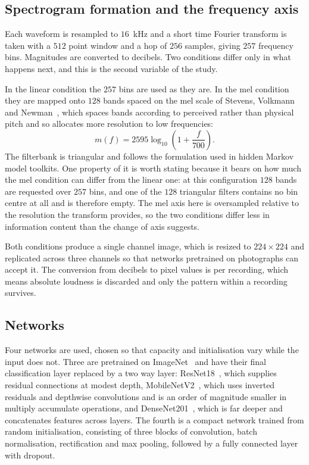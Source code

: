 \documentclass{ieeeaccess}
\begin{document}
\subsection{Spectrogram formation and the frequency axis}\label{sec:design-spectro}

Each waveform is resampled to $16$~kHz and a short time Fourier transform is taken with a
$512$ point window and a hop of $256$ samples, giving $257$ frequency bins. Magnitudes
are converted to decibels. Two conditions differ only in what happens next, and this is
the second variable of the study.

In the linear condition the $257$ bins are used as they are. In the mel condition they are
mapped onto $128$ bands spaced on the mel scale of Stevens, Volkmann and
Newman~\cite{stevens1937}, which spaces bands according to perceived rather than physical
pitch and so allocates more resolution to low frequencies:
\begin{equation}
m(f) = 2595 \log_{10}\!\left(1 + \frac{f}{700}\right).
\label{eq:mel}
\end{equation}
The filterbank is triangular and follows the formulation used in hidden Markov model
toolkits. One property of it is worth stating because it bears on how much the mel
condition can differ from the linear one: at this configuration $128$ bands are requested
over $257$ bins, and one of the $128$ triangular filters contains no bin centre at all and
is therefore empty. The mel axis here is oversampled relative to the resolution the
transform provides, so the two conditions differ less in information content than the
change of axis suggests.

Both conditions produce a single channel image, which is resized to $224 \times 224$ and
replicated across three channels so that networks pretrained on photographs can accept
it. The conversion from decibels to pixel values is per recording, which means absolute
loudness is discarded and only the pattern within a recording survives.

\subsection{Networks}\label{sec:design-nets}

Four networks are used, chosen so that capacity and initialisation vary while the input
does not. Three are pretrained on ImageNet~\cite{russakovsky2015} and have their final
classification layer replaced by a two way layer: ResNet18~\cite{he2016}, which supplies
residual connections at modest depth, MobileNetV2~\cite{sandler2018}, which uses inverted
residuals and depthwise convolutions and is an order of magnitude smaller in multiply
accumulate operations, and DenseNet201~\cite{huang2017}, which is far deeper and
concatenates features across layers. The fourth is a compact network trained from random
initialisation, consisting of three blocks of convolution, batch normalisation,
rectification and max pooling, followed by a fully connected layer with dropout.
\end{document}
